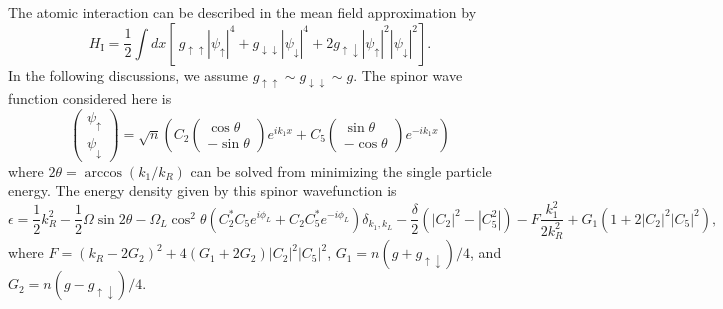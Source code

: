 \documentclass[twocolumn,prl,floatfix,citeautoscript,nofootinbib,superscriptaddress]{revtex4}
\begin{document}
The atomic interaction can be described in the mean field approximation by
\begin{equation*}
H_{\mathrm{I}}=\frac{1}{2}\int dx\left[ ~g_{\uparrow \uparrow }|\psi
_{\uparrow }|^{4}+g_{\downarrow \downarrow }|\psi _{\downarrow
}|^{4}+2g_{\uparrow \downarrow }|\psi _{\uparrow }|^{2}|\psi _{\downarrow
}|^{2}\right] .
\end{equation*}%
In the following discussions, we assume $g_{\uparrow \uparrow }\sim
g_{\downarrow \downarrow }\sim g$. The spinor wave function considered here
is
\begin{equation*}
\left(
\begin{array}{c}
\psi _{\uparrow } \\
\psi _{\downarrow }%
\end{array}%
\right) =\sqrt{n}\left( C_{2}\left(
\begin{array}{c}
\cos {\theta } \\
-\sin {\theta }%
\end{array}%
\right) e^{ik_{1}x}+C_{5}\left(
\begin{array}{c}
\sin {\theta } \\
-\cos {\theta }%
\end{array}%
\right) e^{-ik_{1}x}\right)
\end{equation*}%
where $2\theta =\arccos \left( {k_{1}/k_{R}}\right) $ can be solved from
minimizing the single particle energy. The energy density given by this
spinor wavefunction is \cite{Li2012}%
\begin{equation*}
\epsilon =\frac{1}{2}k_{R}^{2}-\frac{1}{2}\Omega \sin 2\theta -\Omega
_{L}\cos ^{2}\theta (C_{2}^{\ast }C_{5}e^{i\phi _{L}}+C_{2}C_{5}^{\ast
}e^{-i\phi _{L}})\delta _{k_{1},k_{L}}-\frac{\delta }{2}%
(|C_{2}|^{2}-|C_{5}^{2}|)-F\frac{k_{1}^{2}}{2k_{R}^{2}}+G_{1}\left(
1+2|C_{2}|^{2}|C_{5}|^{2}\right) ,
\end{equation*}%
where $F=(k_{R}-2G_{2})^{2}+4(G_{1}+2G_{2})|C_{2}|^{2}|C_{5}|^{2}$, $%
G_{1}=n(g+g_{\uparrow \downarrow })/4$, and $G_{2}=n(g-g_{\uparrow
\downarrow })/4$.
\end{document}
